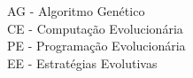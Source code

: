 \listatabelas
 
\listasiglas
	{%
		AG - Algoritmo Genético \\
		CE - Computação Evolucionária \\
		PE - Programação Evolucionária \\
		EE - Estratégias Evolutivas
	}

\sumario

\newpage




